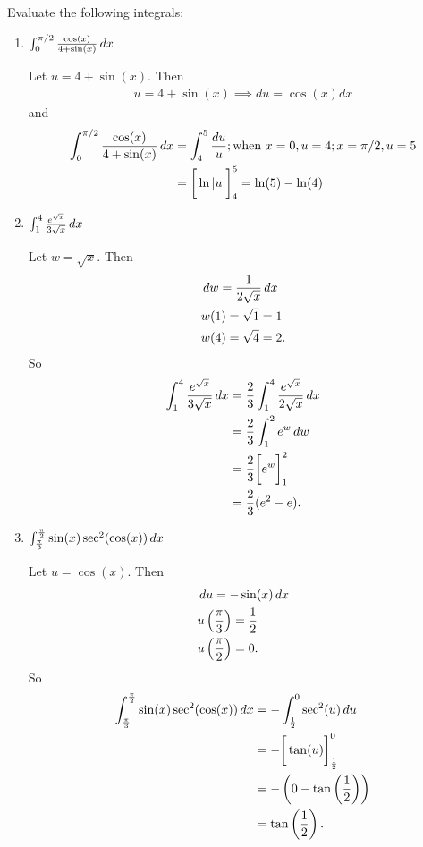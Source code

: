 \documentclass[nooutcomes]{ximera}
\begin{document}
\begin{problem}
Evaluate the following integrals:

	\begin{enumerate}
    \item $\int_0^{\pi/2} \frac{\cos(x)}{4 + \sin(x)} \,d x$

    \begin{freeResponse}
      Let $u = 4 + \sin(x)$.
      Then
      \begin{align*}
        u = 4 + \sin(x) \implies du = \cos(x) dx
      \end{align*}
      and
      \begin{align*}
       \int_0^{\pi/2} \frac{\cos(x)}{4 + \sin(x)} \,d x
       &= \int_{4}^{5} \frac{du}{u}; \text{when}\  x = 0, u=4; x = \pi/2, u=5\\
       &= \bigg[ \ln|u| \bigg]_4^5 = \ln(5) - \ln(4)
      \end{align*}
    \end{freeResponse}
	\item  $\int_1^4 \frac{e^{\sqrt{x}}}{3\sqrt{x}} \,d x$
		\begin{freeResponse}
		Let $w=\sqrt{x}$.  Then
			\begin{align*}
			&\,d w = \frac{1}{2 \sqrt{x}} \,d x  \\
			&w(1) = \sqrt{1} = 1  \\
			&w(4) = \sqrt{4} = 2.
			\end{align*}
		So
			\begin{align*}
			\int_1^4 \frac{e^{\sqrt{x}}}{3\sqrt{x}} \,d x &= \frac{2}{3} \int_1^4 \frac{e^{\sqrt{x}}}{2\sqrt{x}} \,d x  \\
			&= \frac{2}{3} \int_1^2 e^w \,d w  \\
			&= \frac{2}{3} \bigg[ e^w \bigg]_1^2  \\
			&= \frac{2}{3} (e^2 - e).
			\end{align*}
		\end{freeResponse}

	\item  $\int_{\frac{\pi}{3}}^{\frac{\pi}{2}} \sin(x) \sec^2(\cos(x)) \,d x$
		\begin{freeResponse}
		Let $u=\cos(x)$.  Then
			\begin{align*}
			&\,d u = -\sin(x) \,d x  \\
			&u\left( \frac{\pi}{3} \right) = \frac{1}{2}  \\
			&u\left( \frac{\pi}{2} \right) = 0.
			\end{align*}
		So
			\begin{align*}
			\int_{\frac{\pi}{3}}^{\frac{\pi}{2}} \sin(x) \sec^2(\cos(x)) \,d x &= - \int_{\frac{1}{2}}^0 \sec^2(u) \,d u   \\
			&= - \bigg[ \tan(u) \bigg]_{\frac{1}{2}}^0  \\
			&=  -\left( 0 - \tan\left( \frac{1}{2} \right) \right)  \\
			&= \tan \left( \frac{1}{2} \right).
			\end{align*}
		\end{freeResponse}
	\end{enumerate}
\end{problem}
\end{document}
